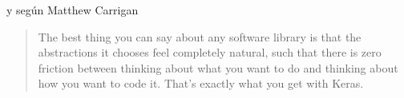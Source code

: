 y según Matthew Carrigan \citep{keraswebsite} \begin{quote}The best thing you can say about any software library is that the abstractions it chooses feel completely natural, such that there is zero friction between thinking about what you want to do and thinking about how you want to code it. That's exactly what you get with Keras.\end{quote}

